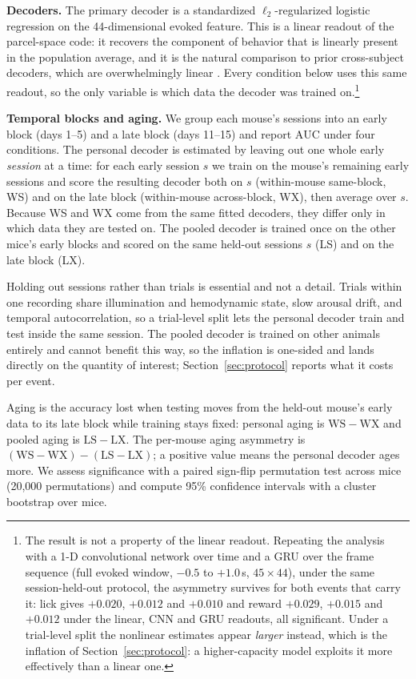 \documentclass{article}
\newcommand{\auc}{\mathrm{AUC}}
\begin{document}
\textbf{Decoders.} The primary decoder is a standardized $\ell_2$-regularized logistic regression on
the 44-dimensional evoked feature. This is a linear readout of the parcel-space code: it recovers the
component of behavior that is linearly present in the population average, and it is the natural
comparison to prior cross-subject decoders, which are overwhelmingly linear
\citep{melbaum2022,peterson2021}. Every condition below uses this same readout, so the only variable
is which data the decoder was trained on.\footnote{The result is not a property of the linear
readout. Repeating the analysis with a 1-D convolutional network over time and a GRU over the frame
sequence (full evoked window, $-0.5$ to $+1.0$\,s, $45 \times 44$), under the same session-held-out
protocol, the asymmetry survives for both events that carry it: lick gives $+0.020$, $+0.012$ and
$+0.010$ and reward $+0.029$, $+0.015$ and $+0.012$ under the linear, CNN and GRU readouts, all
significant. Under a trial-level split the nonlinear estimates appear \emph{larger} instead, which is
the inflation of Section~\ref{sec:protocol}: a higher-capacity model exploits it more effectively
than a linear one.}

\textbf{Temporal blocks and aging.} We group each mouse's sessions into an early block (days 1--5)
and a late block (days 11--15) and report $\auc$ under four conditions. The personal decoder is
estimated by leaving out one whole early \emph{session} at a time: for each early session $s$ we
train on the mouse's remaining early sessions and score the resulting decoder both on $s$
(within-mouse same-block, WS) and on the late block (within-mouse across-block, WX), then average
over $s$. Because WS and WX come from the same fitted decoders, they differ only in which data they
are tested on. The pooled decoder is trained once on the other mice's early blocks and scored on the
same held-out sessions $s$ (LS) and on the late block (LX).

Holding out sessions rather than trials is essential and not a detail. Trials within one recording
share illumination and hemodynamic state, slow arousal drift, and temporal autocorrelation, so a
trial-level split lets the personal decoder train and test inside the same session. The pooled
decoder is trained on other animals entirely and cannot benefit this way, so the inflation is
one-sided and lands directly on the quantity of interest; Section~\ref{sec:protocol} reports what it
costs per event.

Aging is the accuracy lost when testing moves from the held-out mouse's early data to its late block
while training stays fixed: personal aging is $\mathrm{WS}-\mathrm{WX}$ and pooled aging is
$\mathrm{LS}-\mathrm{LX}$. The per-mouse aging asymmetry is
$(\mathrm{WS}-\mathrm{WX})-(\mathrm{LS}-\mathrm{LX})$; a positive value means the personal decoder
ages more. We assess significance with a paired sign-flip permutation test across mice
(20{,}000 permutations) and compute 95\% confidence intervals with a cluster bootstrap over mice.
\end{document}
